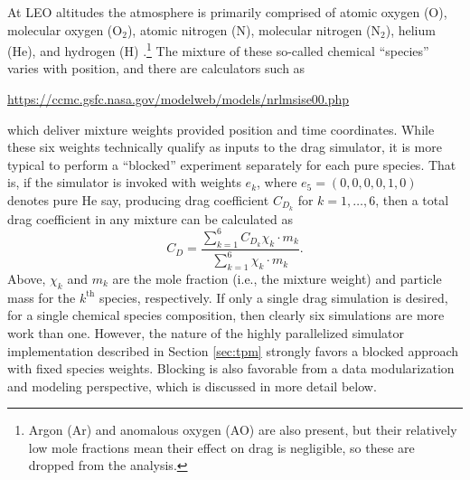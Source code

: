 \documentclass[12pt]{article}
\begin{document}
At LEO altitudes the atmosphere is primarily comprised of atomic oxygen (O),
molecular oxygen (O$_2$), atomic nitrogen (N), molecular nitrogen (N$_2$),
helium (He), and hydrogen (H) \citep{picone:etal:2002}.\footnote{Argon (Ar)
and anomalous oxygen (AO) are also present, but their relatively low mole
fractions mean their effect on drag is negligible, so these are dropped from
the analysis.} The mixture of these so-called chemical ``species'' varies with
position, and there are calculators such as
\begin{center}
\url{https://ccmc.gsfc.nasa.gov/modelweb/models/nrlmsise00.php}
\end{center}
which deliver mixture weights provided position and time coordinates. While
these six weights technically qualify as inputs to the drag simulator, it is
more typical to perform a ``blocked'' experiment separately for each pure
species.  That is, if the simulator is invoked with weights $e_k$,
where $e_5 = (0,0,0,0,1,0)$ denotes pure He say, producing drag
coefficient $C_{D_k}$ for $k=1,\dots, 6$, then a total drag coefficient in any
mixture can be calculated as
\begin{equation}
C_D = \frac{\sum_{k=1}^6 C_{D_k} \chi_k \cdot m_k }{\sum_{k=1}^6  \chi_k \cdot m_k}. \label{eq:mix}
\end{equation}
Above, $\chi_k$ and $m_k$ are the mole fraction (i.e., the mixture weight) and
particle mass for the $k^\mathrm{th}$ species, respectively.  If only a single
drag simulation is desired, for a single chemical species composition, then
clearly six simulations are more work than one.  However, the nature of the
highly parallelized simulator implementation described in Section
\ref{sec:tpm} strongly favors a blocked approach with fixed species weights.
Blocking is also favorable from a data modularization and modeling
perspective, which is discussed in more detail below.
\end{document}
